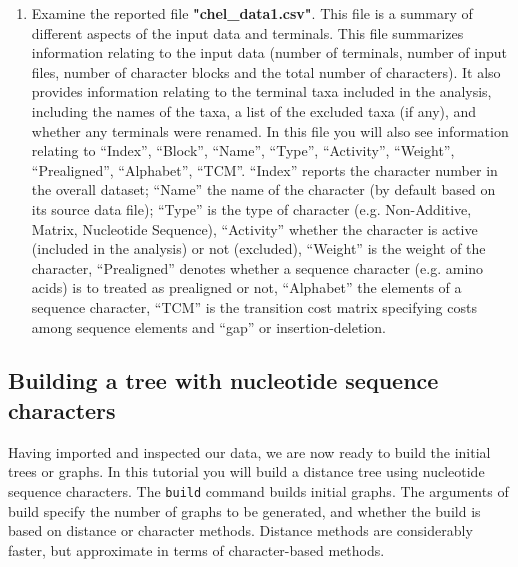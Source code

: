 \documentclass[11pt]{article}
\begin{document}
\begin{enumerate}
\item Examine the reported file \textbf{"chel\_data1.csv"}. This file is a summary 
of different aspects of the input data and terminals. This file summarizes 
information relating to the input data (number of terminals, number of input files, 
number of character blocks and the total number of characters). It also provides
information relating to the terminal taxa included in the analysis, including the 
names of the taxa, a list of the excluded taxa (if any), and whether any terminals 
were renamed. In this file you will also see information relating to 
``Index'', ``Block'', ``Name'', ``Type'', ``Activity'', ``Weight'', ``Prealigned'', ``Alphabet'', 
``TCM''. ``Index'' reports the character number in the overall dataset; ``Name'' the 
name of the character (by default based on its source data file); ``Type'' is the type 
of character (e.g. Non-Additive, Matrix, Nucleotide Sequence), ``Activity'' whether
the character is active (included in the analysis) or not (excluded), ``Weight'' is the 
weight of the character, ``Prealigned''  denotes whether a sequence character 
(e.g. amino acids) is to treated as prealigned or not, ``Alphabet'' the elements of 
a sequence character, ``TCM'' is the transition cost matrix specifying costs among 
sequence elements and ``gap'' or insertion-deletion.
\end{enumerate}

\subsection{Building a tree with nucleotide sequence characters}
\label{subsec:Building}

Having imported and inspected our data, we are now ready to build the initial trees 
or graphs. In this tutorial you will build a distance tree using nucleotide sequence 
characters. The \texttt{build} command builds initial graphs. The arguments of build 
specify the number of graphs to be generated, and whether the build is based on 
distance or character methods. Distance methods are considerably faster, but 
approximate in terms of character-based methods. 
\end{document}
